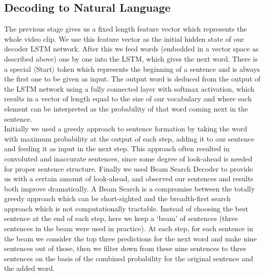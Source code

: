 \documentclass[12pt]{article}
\begin{document}
\subsection{Decoding to Natural Language}
The previous stage gives us a fixed length feature vector which represents the whole video clip. We use this feature vector as the initial hidden state of our decoder LSTM network. After this we feed words (embedded in a vector space as described above) one by one into the LSTM, which gives the next word. There is a special $\langle$Start$\rangle$ token which represents the beginning of a sentence and is always the first one to be given as input. The output word is deduced from the output of the LSTM network using a fully connected layer with softmax activation, which results in a vector of length equal to the size of our vocabulary and where each element can be interpreted as the probability of that word coming next in the sentence.\\
Initially we used a greedy approach to sentence formation by taking the word with maximum probability at the output of  each step, adding it to our sentence and feeding it as input in the next step. This approach often resulted in convoluted and inaccurate sentences, since some degree of look-ahead is needed for proper sentence structure. Finally we used Beam Search Decoder\cite{showandtell} to provide us with a  certain amount of look-ahead, and observed our sentences and results both improve dramatically. A Beam Search is a compromise between the totally greedy approach which can be short-sighted and the breadth-first search approach which is not computationally tractable. Instead of choosing the best sentence at the end of each step, here we keep a  `beam' of sentences (three sentences in the beam were used in practice). At each step, for each sentence in the beam we consider the top three predictions for the next word and make nine sentences out of those, then we filter down from these nine sentences to three sentences on the basis of the combined probability for the original sentence and the added word.
\end{document}
